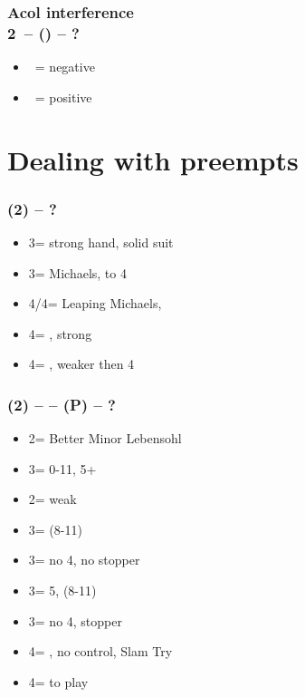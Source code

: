 \subsubsection*{Acol interference\\
                2\clubs\ -- () -- ?}
\begin{itemize}
    \item \dbl\ = negative
    \item \pass\ = positive
\end{itemize}

\section{\texorpdfstring{Dealing with preempts}{dealingWithPreempts}}\label{sec:dealingWithPreempts}

\subsubsection*{(2\hearts) -- ?}
\begin{itemize}
    \item 3\spades = strong hand, solid suit
    \item 3\hearts = Michaels, \ftwon to 4
    \item 4\clubs/4\diams = Leaping Michaels, \gf
    \item 4\hearts = \minor, strong
    \item 4\nt = \minor, weaker then 4\hearts
\end{itemize}

\subsubsection*{(2\hearts) -- \dbl -- (P) -- ?}
\begin{itemize}
    \item 2\nt = Better Minor Lebensohl
    \item 3\clubs = 0-11, 5+\clubs
    \item 2\spades = weak
    \item 3\diams = \inv (8-11)
    \item 3\hearts = no 4\spades, no \hearts stopper
    \item 3\spades = 5\spades, \inv (8-11) \imp
    \item 3\nt = no 4\spades, \hearts stopper
    \item 4\hearts = \minor, no \hearts control, Slam Try
    \item 4\spades = to play
\end{itemize}

